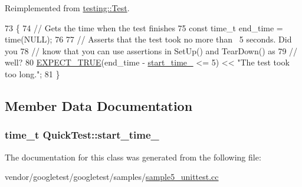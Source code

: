 Reimplemented from \hyperlink{classtesting_1_1Test_a5f0ab439802cbe0ef7552f1a9f791923}{testing\+::\+Test}.


\begin{DoxyCode}
73                           \{
74     \textcolor{comment}{// Gets the time when the test finishes}
75     \textcolor{keyword}{const} time\_t end\_time = time(NULL);
76 
77     \textcolor{comment}{// Asserts that the test took no more than ~5 seconds.  Did you}
78     \textcolor{comment}{// know that you can use assertions in SetUp() and TearDown() as}
79     \textcolor{comment}{// well?}
80     \hyperlink{gtest_8h_ac33e7cdfb5d44a7a0f0ab552eb5c3c6a}{EXPECT\_TRUE}(end\_time - \hyperlink{classQuickTest_aba6a28bbd733e72e3b088a0b66386809}{start\_time\_} <= 5) << \textcolor{stringliteral}{"The test took too long."};
81   \}
\end{DoxyCode}


\subsection{Member Data Documentation}
\subsubsection[{\texorpdfstring{start\+\_\+time\+\_\+}{start_time_}}]{\setlength{\rightskip}{0pt plus 5cm}time\+\_\+t Quick\+Test\+::start\+\_\+time\+\_\+\hspace{0.3cm}{\ttfamily [protected]}}\hypertarget{classQuickTest_aba6a28bbd733e72e3b088a0b66386809}{}\label{classQuickTest_aba6a28bbd733e72e3b088a0b66386809}


The documentation for this class was generated from the following file\+:\begin{DoxyCompactItemize}
\item 
vendor/googletest/googletest/samples/\hyperlink{sample5__unittest_8cc}{sample5\+\_\+unittest.\+cc}\end{DoxyCompactItemize}
